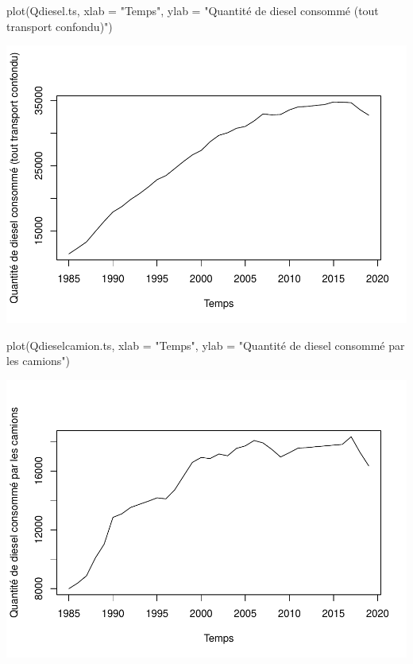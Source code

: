 \documentclass[
]{article}
\newenvironment{Shaded}{\begin{snugshade}}{\end{snugshade}}
\newcommand{\AttributeTok}[1]{\textcolor[rgb]{0.77,0.63,0.00}{#1}}
\newcommand{\FunctionTok}[1]{\textcolor[rgb]{0.00,0.00,0.00}{#1}}
\newcommand{\NormalTok}[1]{#1}
\newcommand{\StringTok}[1]{\textcolor[rgb]{0.31,0.60,0.02}{#1}}
\begin{document}
\begin{Shaded}
\begin{Highlighting}[]
\FunctionTok{plot}\NormalTok{(Qdiesel.ts, }\AttributeTok{xlab =} \StringTok{"Temps"}\NormalTok{, }\AttributeTok{ylab =} \StringTok{"Quantité de diesel consommé (tout transport confondu)"}\NormalTok{)}
\end{Highlighting}
\end{Shaded}

\includegraphics{Projet_econometrie_II_files/figure-latex/unnamed-chunk-4-6.pdf}

\begin{Shaded}
\begin{Highlighting}[]
\FunctionTok{plot}\NormalTok{(Qdieselcamion.ts, }\AttributeTok{xlab =} \StringTok{"Temps"}\NormalTok{, }\AttributeTok{ylab =} \StringTok{"Quantité de diesel consommé par les camions"}\NormalTok{)}
\end{Highlighting}
\end{Shaded}

\includegraphics{Projet_econometrie_II_files/figure-latex/unnamed-chunk-4-7.pdf}
\end{document}
